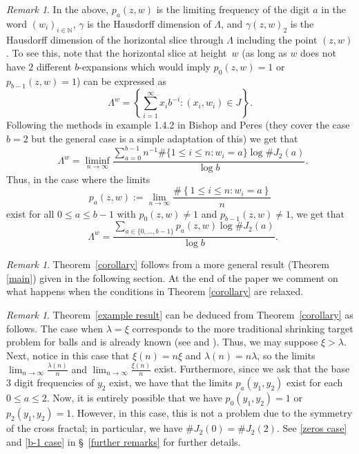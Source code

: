 \documentclass[12pt]{article}
\theoremstyle{remark}
\newtheorem{remark}[definition]{Remark}
\numberwithin{equation}{section}
\renewcommand{\Bbb}[1]{\mathbb{#1}}
\newcommand{\N}{{\Bbb N}}         %
\newcommand{\0}{\mathbf{0}}
\DeclareMathOperator{\dimh}{\dim_H}
\begin{document}
\begin{remark} \rm \label{horizontal slice}
In the above, $p_{a}(z,w)$ is the limiting frequency of the digit $a$ in the word $(w_{i})_{i \in \N}$, $\gamma$ is the Hausdorff dimension of $\Lambda$, and $\gamma(z,w)_{2}$ is the Hausdorff dimension of the horizontal slice through $\Lambda$ including the point $(z,w)$. To see this, note that the horizontal slice at height~$w$ (as long as $w$ does not have $2$ different $b$-expansions  which would imply $p_0(z,w)=1$ or $p_{b-1}(z,w)=1$) can be expressed as
$$\Lambda^{w}=\left\{\sum_{i=1}^{\infty}x_ib^{-i}:(x_i,w_i)\in J\right\}.$$
Following the methods in example 1.4.2 in Bishop and Peres \cite{BishopPeres} (they cover the case $b=2$ but the general case is a simple adaptation of this) we get that
$$\dimh \Lambda^{w}=\liminf_{n\to\infty}\frac{\sum_{a=0}^{b-1}n^{-1}\#\{1\leq i\leq n:w_i=a\}\log\#J_2(a)}{\log b}.$$
Thus, in the case where the limits 
\begin{equation*}
    p_{a}(z,w):=\lim_{n \to \infty}\frac{\#\left\{1 \leq i \leq n : w_{i}=a \right\}}{n}
\end{equation*}
exist for all $0\leq a\leq b-1$ with $p_0(z,w) \neq 1$ and $p_{b-1}(z,w)\neq 1$, we get that
$$\dimh \Lambda^{w}=\frac{\sum_{a \in \{0, \dots , b-1\}} p_{a}(z,w) \log \#J_{2}(a)}{\log b}.$$
\end{remark}

\begin{remark} \rm
Theorem~\ref{corollary} follows from a more general result (Theorem \ref{main}) given in the following section. At the end of the paper we comment on what happens when the conditions in Theorem \ref{corollary} are relaxed.
\end{remark}

\begin{remark} \rm
Theorem~\ref{example result} can be deduced from Theorem~\ref{corollary} as follows. The case when $\lambda=\xi$ {corresponds to the more traditional shrinking target problem for balls and} is already known (see \cite{AllenBarany} and \cite{HillVelani95}). Thus, we may suppose $\xi>\lambda$. {Next, notice in this case that $\xi(n)=n\xi$ and $\lambda(n)=n\lambda$}, so the limits {$\lim_{n \to \infty} \frac{\lambda(n)}{n}$ and $\lim_{n \to \infty} \frac{\xi(n)}{n}$} exist. {Furthermore}, since we ask that the base $3$ digit frequencies of $y_{2}$ exist{, we have that} the limits $p_{a}(y_{1},y_{2})$ exist {for each $0 \leq a \leq 2$}. Now, it is entirely possible that we have $p_{0}(y_{1},y_{2})=1$ or $p_{2}(y_{1},y_{2})=1$. {However, in this case, this is not a problem due to the symmetry of the cross fractal; in particular, we have $\#J_{2}(0)=\#J_{2}(2)$.} See \eqref{zeros case} and \eqref{b-1 case} in \S~\ref{further remarks} for further details.
\end{remark}
\end{document}
